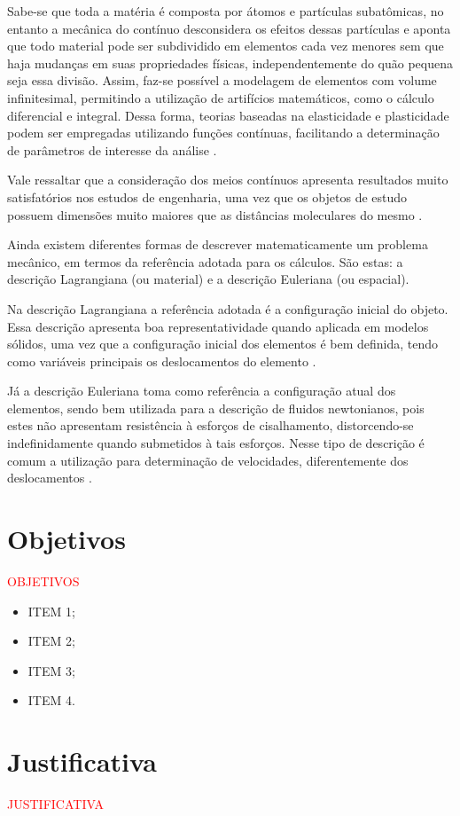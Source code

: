 \documentclass[_ArquivoPrincipal.tex]{subfiles}
\begin{document}
Sabe-se que toda a matéria é composta por átomos e partículas subatômicas, no entanto a mecânica do contínuo desconsidera os efeitos dessas partículas e aponta que todo material pode ser subdividido em elementos cada vez menores sem que haja mudanças em suas propriedades físicas, independentemente do quão pequena seja essa divisão. Assim, faz-se possível a modelagem de elementos com volume infinitesimal, permitindo a utilização de artifícios matemáticos, como o cálculo diferencial e integral. Dessa forma, teorias baseadas na elasticidade e plasticidade podem ser empregadas utilizando funções contínuas, facilitando a determinação de parâmetros de interesse da análise \cite{irgens2008continuum, lai2009introduction, malvern1969introduction}.

Vale ressaltar que a consideração dos meios contínuos apresenta resultados muito satisfatórios nos estudos de engenharia, uma vez que os objetos de estudo possuem dimensões muito maiores que as distâncias moleculares do mesmo \cite{malvern1969introduction, mase2009continuum}.

Ainda existem diferentes formas de descrever matematicamente um problema mecânico, em termos da referência adotada para os cálculos. São estas: a descrição Lagrangiana (ou material) e a descrição Euleriana (ou espacial).

Na descrição Lagrangiana a referência adotada é a configuração inicial do objeto. Essa descrição apresenta boa representatividade quando aplicada em modelos sólidos, uma vez que a configuração inicial dos elementos é bem definida, tendo como variáveis principais os deslocamentos do elemento \cite{sanches2014fluid, fernandes2019ale}.

Já a descrição Euleriana toma como referência a configuração atual dos elementos, sendo bem utilizada para a descrição de fluidos newtonianos, pois estes não apresentam resistência à esforços de cisalhamento, distorcendo-se indefinidamente quando submetidos à tais esforços. Nesse tipo de descrição é comum a utilização para determinação de velocidades, diferentemente dos deslocamentos \cite{sanches2014fluid, fernandes2019ale}.

\section{Objetivos}

\textcolor{red}{OBJETIVOS}

\begin{itemize}
    \item ITEM 1;

    \item ITEM 2;

    \item ITEM 3;

    \item ITEM 4.
\end{itemize}

\section{Justificativa}

\textcolor{red}{JUSTIFICATIVA}
\end{document}
